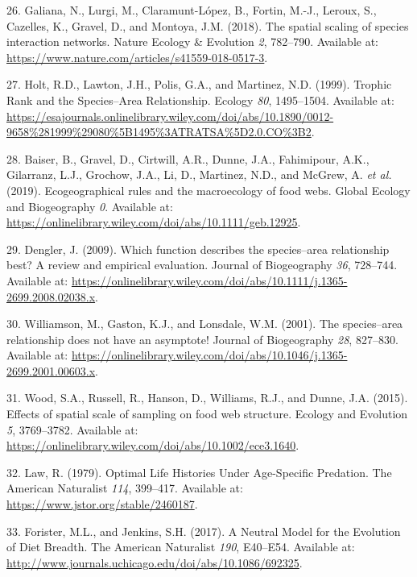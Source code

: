 \documentclass[12pt]{article}
\begin{document}
\begin{cslreferences}
\leavevmode\hypertarget{ref-GaliLurg18}{}%
26. Galiana, N., Lurgi, M., Claramunt-López, B., Fortin, M.-J., Leroux,
S., Cazelles, K., Gravel, D., and Montoya, J.M. (2018). The spatial
scaling of species interaction networks. Nature Ecology \& Evolution
\emph{2}, 782--790. Available at:
\url{https://www.nature.com/articles/s41559-018-0517-3}.

\leavevmode\hypertarget{ref-HoltLawt99}{}%
27. Holt, R.D., Lawton, J.H., Polis, G.A., and Martinez, N.D. (1999).
Trophic Rank and the Species--Area Relationship. Ecology \emph{80},
1495--1504. Available at:
\url{https://esajournals.onlinelibrary.wiley.com/doi/abs/10.1890/0012-9658\%281999\%29080\%5B1495\%3ATRATSA\%5D2.0.CO\%3B2}.

\leavevmode\hypertarget{ref-BaisGrav19}{}%
28. Baiser, B., Gravel, D., Cirtwill, A.R., Dunne, J.A., Fahimipour,
A.K., Gilarranz, L.J., Grochow, J.A., Li, D., Martinez, N.D., and
McGrew, A. \emph{et al.} (2019). Ecogeographical rules and the
macroecology of food webs. Global Ecology and Biogeography \emph{0}.
Available at:
\url{https://onlinelibrary.wiley.com/doi/abs/10.1111/geb.12925}.

\leavevmode\hypertarget{ref-Deng09}{}%
29. Dengler, J. (2009). Which function describes the species--area
relationship best? A review and empirical evaluation. Journal of
Biogeography \emph{36}, 728--744. Available at:
\url{https://onlinelibrary.wiley.com/doi/abs/10.1111/j.1365-2699.2008.02038.x}.

\leavevmode\hypertarget{ref-WillGast01}{}%
30. Williamson, M., Gaston, K.J., and Lonsdale, W.M. (2001). The
species--area relationship does not have an asymptote! Journal of
Biogeography \emph{28}, 827--830. Available at:
\url{https://onlinelibrary.wiley.com/doi/abs/10.1046/j.1365-2699.2001.00603.x}.

\leavevmode\hypertarget{ref-WoodRuss15}{}%
31. Wood, S.A., Russell, R., Hanson, D., Williams, R.J., and Dunne, J.A.
(2015). Effects of spatial scale of sampling on food web structure.
Ecology and Evolution \emph{5}, 3769--3782. Available at:
\url{https://onlinelibrary.wiley.com/doi/abs/10.1002/ece3.1640}.

\leavevmode\hypertarget{ref-Law79}{}%
32. Law, R. (1979). Optimal Life Histories Under Age-Specific Predation.
The American Naturalist \emph{114}, 399--417. Available at:
\url{https://www.jstor.org/stable/2460187}.

\leavevmode\hypertarget{ref-ForiJenk17}{}%
33. Forister, M.L., and Jenkins, S.H. (2017). A Neutral Model for the
Evolution of Diet Breadth. The American Naturalist \emph{190}, E40--E54.
Available at:
\url{http://www.journals.uchicago.edu/doi/abs/10.1086/692325}.


\end{cslreferences}
\end{document}
